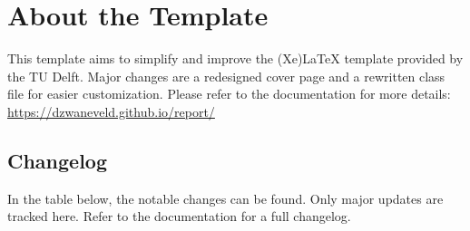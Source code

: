 \chapter{About the Template}
\label{chapter:title}

This template aims to simplify and improve the (Xe)LaTeX template provided by the TU Delft. Major changes are a redesigned cover page and a rewritten class file for easier customization. Please refer to the documentation for more details: \url{https://dzwaneveld.github.io/report/}

\section{Changelog}

In the table below, the notable changes can be found. Only major updates are tracked here. Refer to the documentation for a full changelog.

